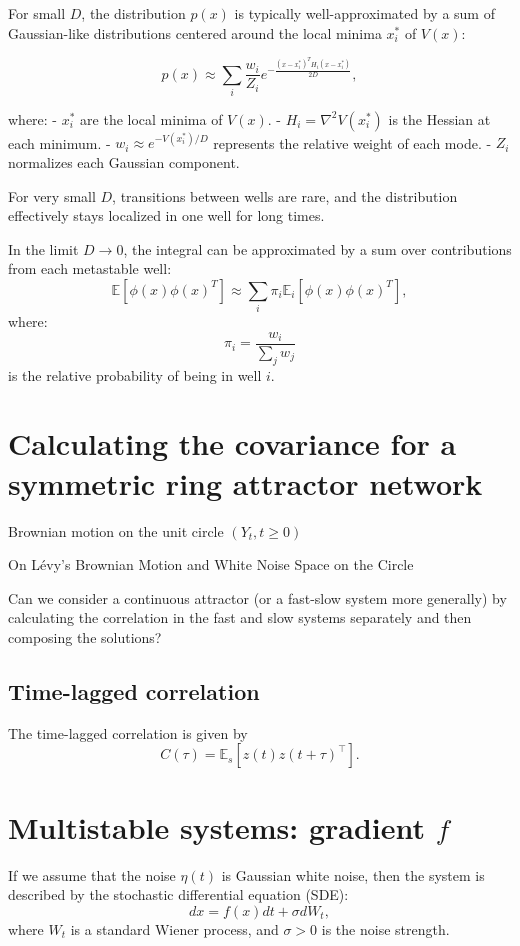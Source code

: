 \documentclass{article}
\theoremstyle{definition} \newtheorem{definition}{Definition}
\theoremstyle{remark} \newtheorem{remark}{Remark}
\newcounter{ct}
\begin{document}
For small \( D \), the distribution \( p(x) \) is typically well-approximated by a sum of Gaussian-like distributions centered around the local minima \( x_i^* \) of \( V(x) \):

\[
p(x) \approx \sum_i \frac{w_i}{Z_i} e^{-\frac{(x - x_i^*)^T H_i (x - x_i^*)}{2D}},
\]

where:
- \( x_i^* \) are the local minima of \( V(x) \).
- \( H_i = \nabla^2 V(x_i^*) \) is the Hessian at each minimum.
- \( w_i \approx e^{-V(x_i^*)/D} \) represents the relative weight of each mode.
- \( Z_i \) normalizes each Gaussian component.

For very small \( D \), transitions between wells are rare, and the distribution effectively stays localized in one well for long times.

In the limit \( D \to 0 \), the integral can be approximated by a sum over contributions from each metastable well:
\[
\mathbb{E}[\phi(x) \phi(x)^T] \approx \sum_i \pi_i \mathbb{E}_i[\phi(x) \phi(x)^T],
\]
where:
\[
\pi_i = \frac{w_i}{\sum_j w_j}
\]
is the relative probability of being in well \( i \).



\section{Calculating the covariance for a symmetric ring attractor network}

Brownian motion on the unit circle \((Y_t , t \geq 0)\) \citep{liu2012stochastic}

On L\'evy’s Brownian Motion and White Noise Space on the Circle \citep{huang2021levy}

Can we consider a continuous attractor (or a fast-slow system more generally) by calculating the correlation in the fast and slow systems separately and then composing the solutions?


\subsection{Time-lagged correlation}
The time-lagged correlation is given by
\[
C(\tau) = \mathbb{E}_s \left[ z(t) z(t + \tau)^\top \right].
\]




\section{Multistable systems: gradient $f$}
If we assume that the noise $\eta(t)$ is Gaussian white noise, then the system is described by the stochastic differential equation (SDE):
\begin{equation}
    dx = f(x)dt + \sigma dW_t,
\end{equation}
where $W_t$ is a standard Wiener process, and $\sigma > 0$ is the noise strength.
\end{document}
